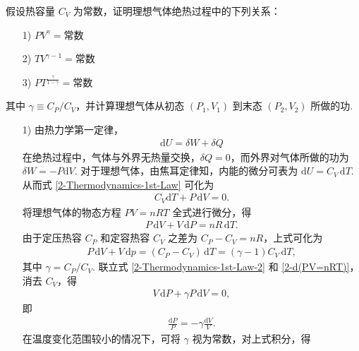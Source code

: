 \documentclass{assignment}
\begin{document}
\begin{prob}
    假设热容量 $C_V$ 为常数，证明理想气体绝热过程中的下列关系：
    \begin{itemize}
        \item[1)] $PV^{\gamma}=$常数
        \item[2)] $TV^{\gamma-1}=$常数
        \item[3)] $PT^{\frac{\gamma}{1-\gamma}}=$常数
    \end{itemize}
    其中 $\gamma\equiv C_P/C_V$，并计算理想气体从初态 $(P_1,V_1)$ 到末态 $(P_2,V_2)$ 所做的功.
\end{prob}
\begin{sol}
    \begin{itemize}
        \item[1)] 由热力学第一定律，
        \begin{align}
            \label{2-Thermodynamics-1st-Law}
            \mathrm{d}U=\delta W+\delta Q
        \end{align}
        在绝热过程中，气体与外界无热量交换，$\delta Q=0$，而外界对气体所做的功为 $\delta W=-P\mathrm{d}V$. 对于理想气体，由焦耳定律知，内能的微分可表为 $\mathrm{d}U=C_V\,\mathrm{d}T$. 从而式 \eqref{2-Thermodynamics-1st-Law} 可化为
        \begin{align}
            \label{2-Thermodynamics-1st-Law-2}
            C_V\mathrm{d}T+P\,\mathrm{d}V=0.
        \end{align}
        将理想气体的物态方程 $PV=nRT$ 全式进行微分，得
        \begin{align}
            P\,\mathrm{d}V+V\,\mathrm{d}P=nR\,\mathrm{d}T.
        \end{align}
        由于定压热容 $C_P$ 和定容热容 $C_V$ 之差为 $C_P-C_V=nR$，上式可化为
        \begin{align}
            \label{2-d(PV=nRT)}
            P\,\mathrm{d}V+V\,\mathrm{d}p=(C_P-C_V)\,\mathrm{d}T=(\gamma-1)C_V\,\mathrm{d}T,
        \end{align}
        其中 $\gamma=C_P/C_V$. 联立式 \eqref{2-Thermodynamics-1st-Law-2} 和 \eqref{2-d(PV=nRT)}，消去 $C_V$，得
        \begin{align}
            V\,\mathrm{d}P+\gamma P\,\mathrm{d}V=0,
        \end{align}
        即
        \begin{align}
            \frac{\mathrm{d}P}{P}=-\gamma\frac{\mathrm{d}V}{V}.
        \end{align}
        在温度变化范围较小的情况下，可将 $\gamma$ 视为常数，对上式积分，得
        \begin{align}

\end{align}
\end{itemize}
\end{sol}
\end{document}
